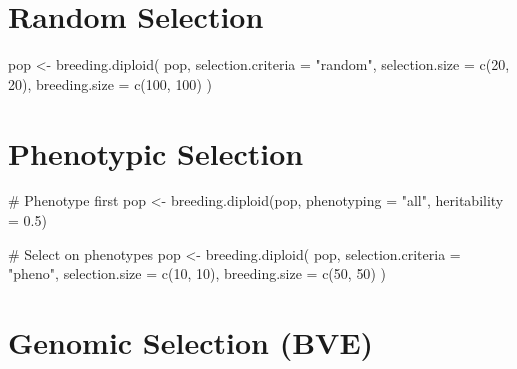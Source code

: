 \documentclass[
  letterpaper,
]{book}
\newenvironment{Shaded}{\begin{snugshade}}{\end{snugshade}}
\newcommand{\AttributeTok}[1]{\textcolor[rgb]{0.40,0.45,0.13}{#1}}
\newcommand{\CommentTok}[1]{\textcolor[rgb]{0.37,0.37,0.37}{#1}}
\newcommand{\DecValTok}[1]{\textcolor[rgb]{0.68,0.00,0.00}{#1}}
\newcommand{\FloatTok}[1]{\textcolor[rgb]{0.68,0.00,0.00}{#1}}
\newcommand{\FunctionTok}[1]{\textcolor[rgb]{0.28,0.35,0.67}{#1}}
\newcommand{\NormalTok}[1]{\textcolor[rgb]{0.00,0.23,0.31}{#1}}
\newcommand{\OtherTok}[1]{\textcolor[rgb]{0.00,0.23,0.31}{#1}}
\newcommand{\StringTok}[1]{\textcolor[rgb]{0.13,0.47,0.30}{#1}}
\begin{document}
\section{Random Selection}\label{random-selection}

\begin{Shaded}
\begin{Highlighting}[]
\NormalTok{pop }\OtherTok{\textless{}{-}} \FunctionTok{breeding.diploid}\NormalTok{(}
\NormalTok{  pop,}
  \AttributeTok{selection.criteria =} \StringTok{"random"}\NormalTok{,}
  \AttributeTok{selection.size =} \FunctionTok{c}\NormalTok{(}\DecValTok{20}\NormalTok{, }\DecValTok{20}\NormalTok{),}
  \AttributeTok{breeding.size =} \FunctionTok{c}\NormalTok{(}\DecValTok{100}\NormalTok{, }\DecValTok{100}\NormalTok{)}
\NormalTok{)}
\end{Highlighting}
\end{Shaded}

\section{Phenotypic Selection}\label{phenotypic-selection}

\begin{Shaded}
\begin{Highlighting}[]
\CommentTok{\# Phenotype first}
\NormalTok{pop }\OtherTok{\textless{}{-}} \FunctionTok{breeding.diploid}\NormalTok{(pop, }\AttributeTok{phenotyping =} \StringTok{"all"}\NormalTok{, }\AttributeTok{heritability =} \FloatTok{0.5}\NormalTok{)}

\CommentTok{\# Select on phenotypes}
\NormalTok{pop }\OtherTok{\textless{}{-}} \FunctionTok{breeding.diploid}\NormalTok{(}
\NormalTok{  pop,}
  \AttributeTok{selection.criteria =} \StringTok{"pheno"}\NormalTok{,}
  \AttributeTok{selection.size =} \FunctionTok{c}\NormalTok{(}\DecValTok{10}\NormalTok{, }\DecValTok{10}\NormalTok{),}
  \AttributeTok{breeding.size =} \FunctionTok{c}\NormalTok{(}\DecValTok{50}\NormalTok{, }\DecValTok{50}\NormalTok{)}
\NormalTok{)}
\end{Highlighting}
\end{Shaded}

\section{Genomic Selection (BVE)}\label{genomic-selection-bve}
\end{document}
